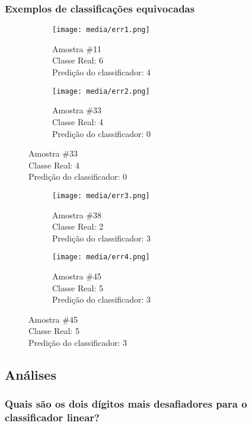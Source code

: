 \documentclass[a4paper]{article}
\begin{document}
\subsubsection{Exemplos de classificações equivocadas}

\begin{figure}[H]
    \centering
    \begin{subfigure}{.5\textwidth}
        \centerline{\texttt{[image: media/err1.png]}}
        \caption{Amostra \#11  \\ Classe Real: 6 \\ Predição do classificador: 4}
        \label{fig:fig20}
    \end{subfigure}%
    \begin{subfigure}{.5\textwidth}
        \centerline{\texttt{[image: media/err2.png]}}
        \caption{Amostra \#33  \\ Classe Real: 4 \\ Predição do classificador: 0}
        \label{fig:fig21}
    \end{subfigure}%
\end{figure}
\begin{figure}[H]
    \centering
    \begin{subfigure}{.5\textwidth}
        \centerline{\texttt{[image: media/err3.png]}}
        \caption{Amostra \#38  \\ Classe Real: 2 \\ Predição do classificador: 3}
        \label{fig:fig22}
    \end{subfigure}%
    \begin{subfigure}{.5\textwidth}
        \centerline{\texttt{[image: media/err4.png]}}
        \caption{Amostra \#45  \\ Classe Real: 5 \\ Predição do classificador: 3}
        \label{fig:fig23}
    \end{subfigure}%
\end{figure}

\subsection{Análises}

\subsubsection{Quais são os dois dígitos mais desafiadores para o classificador linear?}
\end{document}
